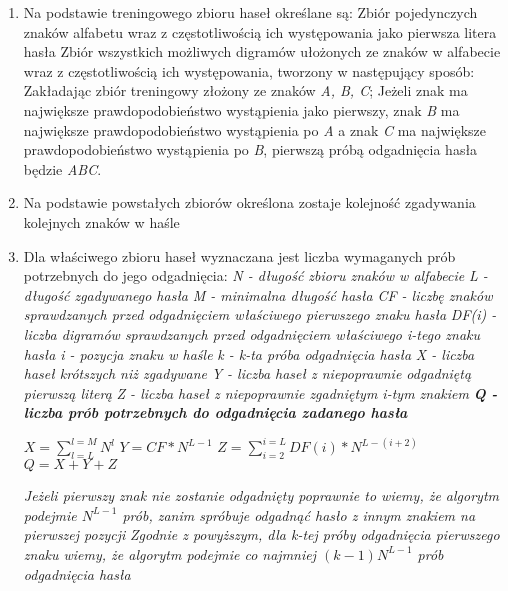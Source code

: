 \documentclass{article}
\begin{document}
	\begin{enumerate}
		\item Na podstawie treningowego zbioru haseł określane są:
		\subitem Zbiór pojedynczych znaków alfabetu wraz z częstotliwością ich występowania jako pierwsza litera hasła 
		\subitem Zbiór wszystkich możliwych digramów ułożonych ze znaków w alfabecie wraz z częstotliwością ich występowania, tworzony w następujący sposób:
		\subsubitem Zakładając zbiór treningowy złożony ze znaków \textit{A, B, C}; Jeżeli znak  ma największe prawdopodobieństwo wystąpienia jako pierwszy, znak \textit{B} ma największe prawdopodobieństwo wystąpienia po \textit{A} a znak \textit{C} ma największe prawdopodobieństwo wystąpienia po \textit{B}, pierwszą próbą odgadnięcia hasła będzie \textit{ABC}.
		\item Na podstawie powstałych zbiorów określona zostaje kolejność zgadywania kolejnych znaków w haśle	
		
		\item Dla właściwego zbioru haseł wyznaczana jest liczba wymaganych prób potrzebnych do jego odgadnięcia:
		\subitem \textit{N - długość zbioru znaków w alfabecie}
		\subitem \textit{L - długość zgadywanego hasła}
		\subitem \textit{M - minimalna długość hasła}
		\subitem \textit{CF - liczbę znaków sprawdzanych przed odgadnięciem właściwego pierwszego znaku hasła}
		\subitem \textit{DF(i) - liczba digramów sprawdzanych przed odgadnięciem właściwego i-tego znaku hasła}
		\subitem \textit{i - pozycja znaku w haśle}
		\subitem \textit{k - k-ta próba odgadnięcia hasła}
		\subitem \textit{X - liczba haseł krótszych niż zgadywane}
		\subitem \textit{Y - liczba haseł z niepoprawnie odgadniętą pierwszą literą}
		\subitem \textit{Z - liczba haseł z niepoprawnie zgadniętym i-tym znakiem}
		\subitem \textbf{\textit{Q - liczba prób potrzebnych do odgadnięcia zadanego hasła}}
		
		\subitem $ X = \sum_{l = L}^{l = M} N^l $		
		\subitem $ Y = CF * N^{L-1} $		
		\subitem $ Z = \sum_{i = 2}^{i = L} DF(i) * N^{L - (i + 2)} $		
		\subitem $ Q = X + Y + Z $
		
		\subitem \textit{Jeżeli pierwszy znak nie zostanie odgadnięty poprawnie to wiemy, że algorytm podejmie $ N^{L-1} $ prób, zanim spróbuje odgadnąć hasło z innym znakiem na pierwszej pozycji}
		\subitem \textit{Zgodnie z powyższym, dla k-tej próby odgadnięcia pierwszego znaku wiemy, że algorytm podejmie co najmniej $ (k-1)N^{L-1} $ prób odgadnięcia hasła}
	\end{enumerate}
	
\end{document}
